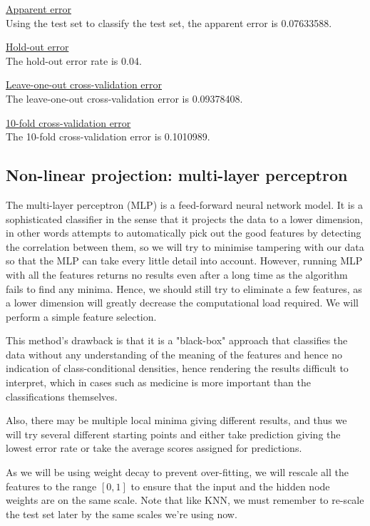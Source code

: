 \documentclass[11pt, a4paper]{article}
\begin{document}
\underline{Apparent error}
\\
Using the test set to classify the test set, the apparent error is 0.07633588.

\underline{Hold-out error}
\\
The hold-out error rate is 0.04.

\underline{Leave-one-out cross-validation error}
\\
The leave-one-out cross-validation error is 0.09378408.

\underline{10-fold cross-validation error}
\\
The 10-fold cross-validation error is 0.1010989.


\subsection{Non-linear projection: multi-layer perceptron}

The multi-layer perceptron (MLP) is a feed-forward neural network model. It is a sophisticated classifier in the sense that it projects the data to a lower dimension, in other words attempts to automatically pick out the good features by detecting the correlation between them, so we will try to minimise tampering with our data so that the MLP can take every little detail into account. However, running MLP with all the features returns no results even after a long time as the algorithm fails to find any minima. Hence, we should still try to eliminate a few features, as a lower dimension will greatly decrease the computational load required. We will perform a simple feature selection.

This method's drawback is that it is a "black-box" approach that classifies the data without any understanding of the meaning of the features and hence no indication of class-conditional densities, hence rendering the results difficult to interpret, which in cases such as medicine is more important than the classifications themselves. 

Also, there may be multiple local minima giving different results, and thus we will try several different starting points and either take prediction giving the lowest error rate or take the average scores assigned for predictions.

As we will be using weight decay to prevent over-fitting, we will rescale all the features to the range $[0,1]$ to ensure that the input and the hidden node weights are on the same scale. Note that like KNN, we must remember to re-scale the test set later by the same scales we're using now.
\end{document}
